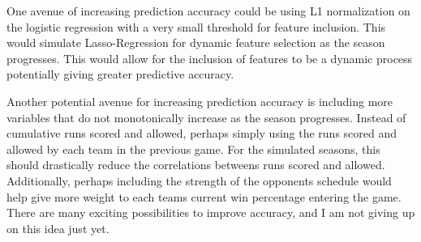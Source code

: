 \documentclass{article}
\begin{document}
One avenue of increasing prediction accuracy could be using L1 normalization 
on the logistic regression with a very small threshold for feature inclusion.
This would simulate Lasso-Regression for dynamic feature selection as the
season progresses.
This would allow for the inclusion of features to be a dynamic process 
potentially giving greater predictive accuracy. \par

Another potential avenue for increasing prediction accuracy is including more
variables that do not monotonically increase as the season progresses.
Instead of cumulative runs scored and allowed,
perhaps simply using the runs scored and allowed by each team in the previous
game.
For the simulated seasons,
this should drastically reduce the correlations betweens 
runs scored and allowed.
Additionally,
perhaps including the strength of the opponents schedule would help give more
weight to each teams current win percentage entering the game.
There are many exciting possibilities to improve accuracy,
and I am not giving up on this idea just yet.

\newpage


\end{document}
